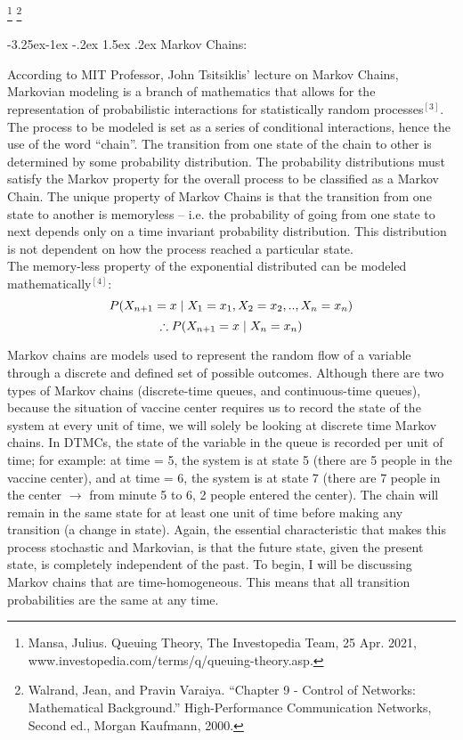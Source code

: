\documentclass[11pt]{article}
\makeatletter
\renewcommand\subsection{\@startsection{subsection}{2}{\z@}%
                                         {-3.25ex\@plus -1ex \@minus -.2ex}%
                                         {1.5ex \@plus .2ex}%
                                         {\normalfont\fontfamily{phv}\fontsize{14}{17}\bfseries}}
\makeatother
\begin{document}
\footnote{Mansa, Julius. Queuing Theory, The Investopedia Team, 25 Apr. 2021, www.investopedia.com/terms/q/queuing-theory.asp.}
\footnote{Walrand, Jean, and Pravin Varaiya. “Chapter 9 - Control of Networks: Mathematical Background.” High-Performance Communication Networks, Second ed., Morgan Kaufmann, 2000.}

\subsection{Markov Chains:} \label{s:methods}

According to MIT Professor, John Tsitsiklis' lecture on Markov Chains, Markovian modeling is a branch of mathematics that allows for the representation of probabilistic interactions for statistically random processes$^{[3]}$. The process to be modeled is set as a series of conditional interactions, hence the use of the word “chain”. The transition from one state of the chain to other is determined by some probability distribution. The probability distributions must satisfy the Markov property for the overall process to be classified as a Markov Chain. The unique property of Markov Chains is that the transition from one state to another is memoryless – i.e. the probability of going from one state to next depends only on a time invariant probability distribution. This distribution is not dependent on how the process reached a particular state.\\
The memory-less property of the exponential distributed can be modeled mathematically$^{[4]}$: $$P(X_{n+1} = x \hspace{1mm} | \hspace{1mm} X_1 = x_1, X_2 = x_2,.., X_n = x_n)$$
$$\therefore P(X_{n+1} = x \hspace{1mm} | \hspace{1mm} X_n = x_n)$$

Markov chains are models used to represent the random flow of a variable through a discrete and defined set of possible outcomes. Although there are two types of Markov chains (discrete-time queues, and continuous-time queues), because the situation of vaccine center requires us to record the state of the system at every unit of time, we will solely be looking at discrete time Markov chains. In DTMCs, the state of the variable in the queue is recorded per unit of time; for example: at time = 5, the system is at state 5 (there are 5 people in the vaccine center), and at time = 6, the system is at state 7 (there are 7 people in the center $\xrightarrow{}$ from minute 5 to 6, 2 people entered the center). The chain will remain in the same state for at least one unit of time before making any transition (a change in state). Again, the essential characteristic that makes this process stochastic and Markovian, is that the future state, given the present state, is completely independent of the past. To begin, I will be discussing Markov chains that are time-homogeneous. This means that all transition probabilities are the same at any time. \\
\end{document}
